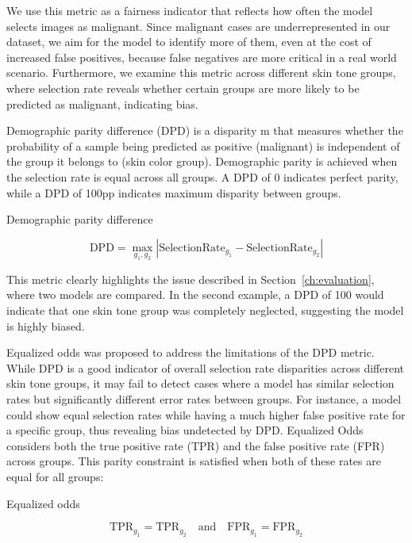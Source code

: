 We use this metric as a fairness indicator that reflects how often the model selects images as malignant. Since malignant cases are underrepresented in our dataset, we aim for the model to identify more of them, even at the cost of increased false positives, because false negatives are more critical in a real world scenario. Furthermore, we examine this metric across different skin tone groups, where selection rate reveals whether certain groups are more likely to be predicted as malignant, indicating bias.

Demographic parity difference (DPD) is a disparity m that measures whether the probability of a sample being predicted as positive (malignant) is independent of the group it belongs to (skin color group). 
Demographic parity is achieved when the selection rate is equal across all groups. A DPD of 0 indicates perfect parity, while a DPD of 100pp indicates maximum disparity between groups.


\begin{myequation}[H]
\caption{Demographic parity difference}
\label{eq:dpd}
\[
\text{DPD} = \max_{g_1, g_2} \left| \text{SelectionRate}_{g_1} - \text{SelectionRate}_{g_2} \right|
\]
\end{myequation}

This metric clearly highlights the issue described in Section~\ref{ch:evaluation}, where two models are compared. In the second example, a DPD of 100 would indicate that one skin tone group was completely neglected, suggesting the model is highly biased.


Equalized odds was proposed to address the limitations of the DPD metric. While DPD is a good indicator of overall selection rate disparities across different skin tone groups, it may fail to detect cases where a model has similar selection rates but significantly different error rates between groups. For instance, a model could show equal selection rates while having a much higher false positive rate for a specific group, thus revealing bias undetected by DPD. Equalized Odds considers both the true positive rate (TPR) and the false positive rate (FPR) across groups. This parity constraint is satisfied when both of these rates are equal for all groups:

\begin{myequation}[H]
\caption{Equalized odds}
\label{eq:equalized_odds}
\[
\text{TPR}_{g_1} = \text{TPR}_{g_2} \quad \text{and} \quad \text{FPR}_{g_1} = \text{FPR}_{g_2}
\]
\end{myequation}

